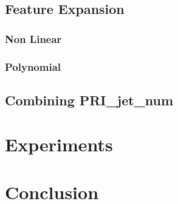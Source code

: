 \documentclass[10pt,conference,compsocconf]{IEEEtran}
\begin{document}
\subsection{Feature Expansion}

\subsubsection{Non Linear}

\subsubsection{Polynomial}

\subsection{Combining PRI\_jet\_num }


\section{Experiments}

\section{Conclusion}

\newpage

\begin{thebibliography}{9}


\end{thebibliography}
\end{document}
